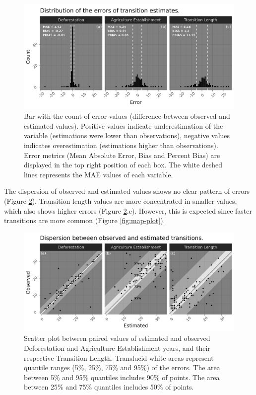 \documentclass[essd, manuscript]{copernicus}
\begin{document}
\begin{figure}[ht]
\includegraphics[width=17cm]{figs/error_bars} \caption{Bar with the count of error values (difference between observed and estimated values). Positive values indicate underestimation of the variable (estimations were lower than observations), negative values indicates overestimation (estimations higher than observations). Error metrics (Mean Absolute Error, Bias and Percent Bias) are displayed in the top right position of each box. The white deshed lines represents the MAE values of each variable.}\label{fig:errorbar-plot}
\end{figure}

The dispersion of observed and estimated values shows no clear pattern of errors (Figure \ref{fig:errorscatter-plot}).
Transition length values are more concentrated in smaller values, which also shows higher errors (Figure \ref{fig:errorscatter-plot}.c).
However, this is expected since faster transitions are more common (Figure \ref{fig:map-plot}).

\begin{figure}[ht]
\includegraphics[width=17cm]{figs/error_scatter} \caption{Scatter plot between paired values of estimated and observed Deforestation and Agriculture Establishment years, and their respective Transition Length. Translucid white areas represent quantile ranges (5\%, 25\%, 75\% and 95\%) of the errors. The area between 5\% and 95\% quantiles includes 90\% of points. The area between 25\% and 75\% quantiles includes 50\% of points.}\label{fig:errorscatter-plot}
\end{figure}
\end{document}
